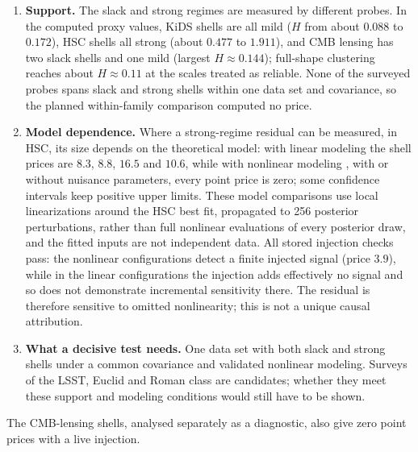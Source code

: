 \begin{enumerate}
\def\labelenumi{\arabic{enumi}.}
\tightlist
\item
  \textbf{Support.} The slack and strong regimes are measured by
  different probes. In the computed proxy values, KiDS shells are all
  mild (\(H\) from about \(0.088\) to \(0.172\)), HSC shells all strong
  (about \(0.477\) to \(1.911\)), and CMB lensing has two slack shells
  and one mild (largest \(H\approx0.144\)); full-shape clustering
  reaches about \(H\approx0.11\) at the scales treated as reliable. None
  of the surveyed probes spans slack and strong shells within one data
  set and covariance, so the planned within-family comparison computed
  no price.
\item
  \textbf{Model dependence.} Where a strong-regime residual can be
  measured, in HSC, its size depends on the theoretical model: with
  linear modeling the shell prices are \(8.3\), \(8.8\), \(16.5\) and
  \(10.6\), while with nonlinear modeling \citep{Takahashi2012}, with or
  without nuisance parameters, every point price is zero; some
  confidence intervals keep positive upper limits. These model
  comparisons use local linearizations around the HSC best fit,
  propagated to 256 posterior perturbations, rather than full nonlinear
  evaluations of every posterior draw, and the fitted inputs are not
  independent data. All stored injection checks pass: the nonlinear
  configurations detect a finite injected signal (price \(3.9\)), while
  in the linear configurations the injection adds effectively no signal
  and so does not demonstrate incremental sensitivity there. The
  residual is therefore sensitive to omitted nonlinearity; this is not a
  unique causal attribution.
\item
  \textbf{What a decisive test needs.} One data set with both slack and
  strong shells under a common covariance and validated nonlinear
  modeling. Surveys of the LSST, Euclid and Roman class are candidates;
  whether they meet these support and modeling conditions would still
  have to be shown.
\end{enumerate}

The CMB-lensing shells, analysed separately as a diagnostic, also give
zero point prices with a live injection.
